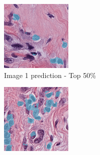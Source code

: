 \begin{figure}[H]
  \centering
  \begin{subfigure}[b]{0.32\textwidth}
    \centering
    \includegraphics[width=\linewidth]{assets/images/for_presentation/exp3-1-pred-top50.png}
    \caption{Image 1 prediction - Top 50\%}
  \end{subfigure}\hfill
  \begin{subfigure}[b]{0.32\textwidth}
    \centering
    \includegraphics[width=\linewidth]{assets/images/for_presentation/exp3-2-pred-top50.png}

\end{subfigure}
\end{figure}
